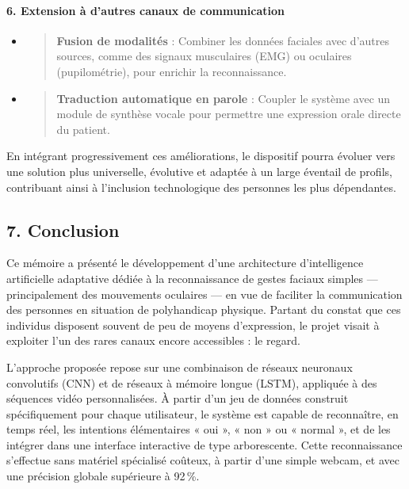 \documentclass[
]{article}
\begin{document}
\hypertarget{extension-uxe0-dautres-canaux-de-communication}{%
\paragraph{\texorpdfstring{\textbf{6. Extension à d'autres canaux de communication}}{6. Extension à d'autres canaux de communication}}\label{extension-uxe0-dautres-canaux-de-communication}}

\begin{itemize}
\item
  \begin{quote}
  \textbf{Fusion de modalités} : Combiner les données faciales avec d'autres sources, comme des signaux musculaires (EMG) ou oculaires (pupilométrie), pour enrichir la reconnaissance.
  \end{quote}
\item
  \begin{quote}
  \textbf{Traduction automatique en parole} : Coupler le système avec un module de synthèse vocale pour permettre une expression orale directe du patient.
  \end{quote}
\end{itemize}

En intégrant progressivement ces améliorations, le dispositif pourra évoluer vers une solution plus universelle, évolutive et adaptée à un large éventail de profils, contribuant ainsi à l'inclusion technologique des personnes les plus dépendantes.

\hypertarget{conclusion}{%
\subsection{7. Conclusion}\label{conclusion}}

Ce mémoire a présenté le développement d'une architecture d'intelligence artificielle adaptative dédiée à la reconnaissance de gestes faciaux simples --- principalement des mouvements oculaires --- en vue de faciliter la communication des personnes en situation de polyhandicap physique. Partant du constat que ces individus disposent souvent de peu de moyens d'expression, le projet visait à exploiter l'un des rares canaux encore accessibles : le regard.

L'approche proposée repose sur une combinaison de réseaux neuronaux convolutifs (CNN) et de réseaux à mémoire longue (LSTM), appliquée à des séquences vidéo personnalisées. À partir d'un jeu de données construit spécifiquement pour chaque utilisateur, le système est capable de reconnaître, en temps réel, les intentions élémentaires « oui », « non » ou « normal », et de les intégrer dans une interface interactive de type arborescente. Cette reconnaissance s'effectue sans matériel spécialisé coûteux, à partir d'une simple webcam, et avec une précision globale supérieure à 92\,\%.
\end{document}
